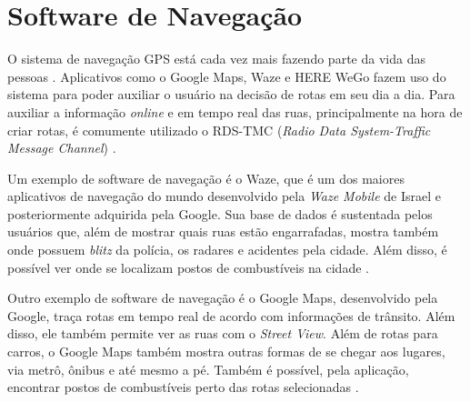 \section{Software de Navegação}

O sistema de navegação GPS está cada vez mais fazendo parte da vida das pessoas \cite{gps-1}. Aplicativos como o Google Maps, Waze e HERE WeGo fazem uso do sistema para poder auxiliar o usuário na decisão de rotas em seu dia a dia. Para auxiliar a informação \textit{online} e em tempo real das ruas, principalmente na hora de criar rotas, é comumente utilizado o RDS-TMC (\textit{Radio Data System-Traffic Message Channel}) \cite{rds-tmc}.

Um exemplo de software de navegação é o Waze, que é um dos maiores aplicativos de navegação do mundo desenvolvido pela \textit{Waze Mobile} de Israel e posteriormente adquirida pela Google. Sua base de dados é sustentada pelos usuários que, além de mostrar quais ruas estão engarrafadas, mostra também onde possuem \textit{blitz} da polícia, os radares e acidentes pela cidade. Além disso, é possível ver onde se localizam postos de combustíveis na cidade \cite{waze}.

Outro exemplo de software de navegação é o Google Maps, desenvolvido pela Google, traça rotas em tempo real de acordo com informações de trânsito. Além disso, ele também permite ver as ruas com o \textit{Street View}. Além de rotas para carros, o Google Maps também mostra outras formas de se chegar aos lugares, via metrô, ônibus e até mesmo a pé. Também é possível, pela aplicação, encontrar postos de combustíveis perto das rotas selecionadas \cite{google-maps}.